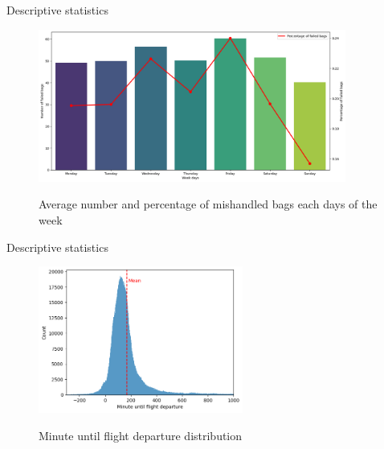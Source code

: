 \documentclass{beamer}
\begin{document}
\begin{frame}{Descriptive statistics} 

\begin{figure}[h]
    \centering
    \includegraphics[width=0.9\textwidth]{Number and percentage of failed bags within a week.png}\\
    \caption{Average number and percentage of mishandled bags each days of the week}
    \label{fig:Average number and percentage of mishandled bags each days of the week}
\end{figure}
\end{frame}







\begin{frame}{Descriptive statistics} 
    \begin{figure}[h]
        \centering
        \includegraphics[width=0.6\textwidth]{Minute until flight departure.png}\\
        \caption{Minute until flight departure distribution}
        \label{fig:Minute until flight departure distribution}
    \end{figure}
\end{frame}
\end{document}
